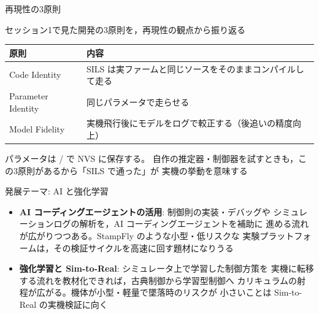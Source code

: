 \begin{frame}{再現性の3原則\later}
  \vspace{0.3em}

  {\small セッション1で見た開発の3原則を，再現性の観点から振り返る}

  \vspace{0.3em}

  \begin{table}
    \centering\footnotesize
    \begin{tabular}{lp{80mm}}
      \hline
      \textbf{原則} & \textbf{内容} \\
      \hline
      Code Identity & SILS は実ファームと同じソースをそのままコンパイルして走る \\
      Parameter Identity & 同じパラメータで走らせる \\
      Model Fidelity & 実機飛行後にモデルをログで較正する（後追いの精度向上） \\
      \hline
    \end{tabular}
  \end{table}

  \vspace{0.5em}

  {\small パラメータは / で NVS に保存する。
  自作の推定器・制御器を試すときも，この3原則があるから「SILS で通った」が
  実機の挙動を意味する}
\end{frame}

\begin{frame}{発展テーマ: AI と強化学習\later}
  \begin{itemize}\small
    \item \textbf{AI コーディングエージェントの活用}: 制御則の実装・デバッグや
          シミュレーションログの解析を，AI コーディングエージェントを補助に
          進める流れが広がりつつある。StampFly のような小型・低リスクな
          実験プラットフォームは，その検証サイクルを高速に回す題材になりうる
    \item \textbf{強化学習と Sim-to-Real}: シミュレータ上で学習した制御方策を
          実機に転移する流れを教材化できれば，古典制御から学習型制御へ
          カリキュラムの射程が広がる。機体が小型・軽量で墜落時のリスクが
          小さいことは Sim-to-Real の実機検証に向く
  \end{itemize}
\end{frame}

